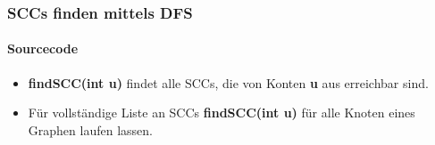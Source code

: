 \begin{frame}
	\frametitle{SCCs finden mittels DFS}
	\framesubtitle{Sourcecode}
	
\end{frame}

\begin{frame}
	\begin{itemize} 
		\item \textbf{findSCC(int u)} findet alle SCCs, die von Konten \textbf{u} aus erreichbar sind.
			\item Für vollständige Liste an SCCs \textbf{findSCC(int u)} für alle Knoten eines Graphen laufen lassen.
	\end{itemize}
\end{frame}
